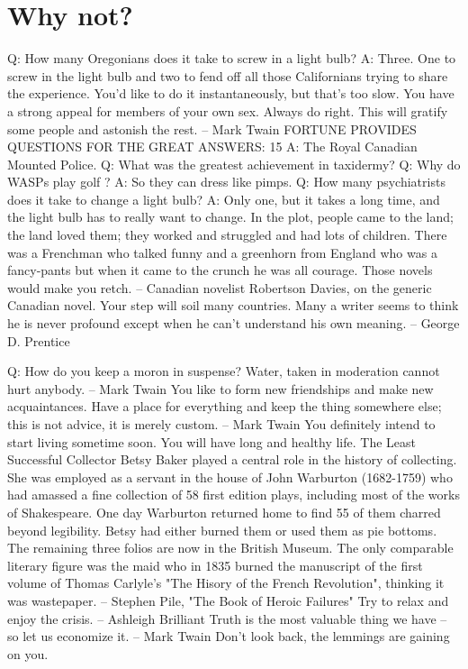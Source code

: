 \section{Why not?}
Q:	How many Oregonians does it take to screw in a light bulb?
A:	Three.  One to screw in the light bulb and two to fend off all those
	Californians trying to share the experience.
You'd like to do it instantaneously, but that's too slow.
You have a strong appeal for members of your own sex.
Always do right.  This will gratify some people and astonish the rest.
		-- Mark Twain
FORTUNE PROVIDES QUESTIONS FOR THE GREAT ANSWERS: 15
A:	The Royal Canadian Mounted Police.
Q:	What was the greatest achievement in taxidermy?
Q:	Why do WASPs play golf ?
A:	So they can dress like pimps.
Q:	How many psychiatrists does it take to change a light bulb?
A:	Only one, but it takes a long time, and the light bulb has
	to really want to change.
In the plot, people came to the land; the land loved them; they worked and
struggled and had lots of children.  There was a Frenchman who talked funny
and a greenhorn from England who was a fancy-pants but when it came to the
crunch he was all courage.  Those novels would make you retch.
		-- Canadian novelist Robertson Davies, on the generic Canadian
		   novel.
Your step will soil many countries.
Many a writer seems to think he is never profound except when he can't
understand his own meaning.
		-- George D. Prentice

Q:	How do you keep a moron in suspense?
Water, taken in moderation cannot hurt anybody.
		-- Mark Twain
You like to form new friendships and make new acquaintances.
Have a place for everything and keep the thing somewhere else; this is not
advice, it is merely custom.
		-- Mark Twain
You definitely intend to start living sometime soon.
You will have long and healthy life.
The Least Successful Collector
	Betsy Baker played a central role in the history of collecting.  She
was employed as a servant in the house of John Warburton (1682-1759) who had
amassed a fine collection of 58 first edition plays, including most of the
works of Shakespeare.
	One day Warburton returned home to find 55 of them charred beyond
legibility.  Betsy had either burned them or used them as pie bottoms.  The
remaining three folios are now in the British Museum.
	The only comparable literary figure was the maid who in 1835 burned
the manuscript of the first volume of Thomas Carlyle's "The Hisory of the
French Revolution", thinking it was wastepaper.
		-- Stephen Pile, "The Book of Heroic Failures"
Try to relax and enjoy the crisis.
		-- Ashleigh Brilliant
Truth is the most valuable thing we have -- so let us economize it.
		-- Mark Twain
Don't look back, the lemmings are gaining on you.

